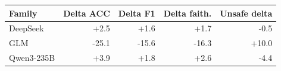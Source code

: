 \begin{tabular}{lrrrr}
\toprule
Family & Delta ACC & Delta F1 & Delta faith. & Unsafe delta \\
\midrule
DeepSeek & +2.5 & +1.6 & +1.7 & -0.5 \\
GLM & -25.1 & -15.6 & -16.3 & +10.0 \\
Qwen3-235B & +3.9 & +1.8 & +2.6 & -4.4 \\
\bottomrule
\end{tabular}
